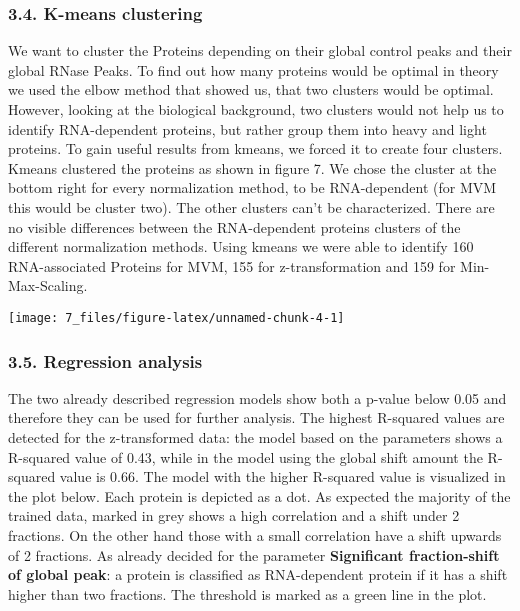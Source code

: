 \documentclass[
  12pt,
]{article}
\begin{document}
\hypertarget{k-means-clustering-1}{%
\subsubsection{3.4. K-means clustering}\label{k-means-clustering-1}}

We want to cluster the Proteins depending on their global control peaks
and their global RNase Peaks. To find out how many proteins would be
optimal in theory we used the elbow method that showed us, that two
clusters would be optimal. However, looking at the biological
background, two clusters would not help us to identify RNA-dependent
proteins, but rather group them into heavy and light proteins. To gain
useful results from kmeans, we forced it to create four clusters. Kmeans
clustered the proteins as shown in figure 7. We chose the cluster at the
bottom right for every normalization method, to be RNA-dependent (for
MVM this would be cluster two). The other clusters can't be
characterized. There are no visible differences between the
RNA-dependent proteins clusters of the different normalization methods.
Using kmeans we were able to identify 160 RNA-associated Proteins for
MVM, 155 for z-transformation and 159 for Min-Max-Scaling.

\texttt{[image: 7\_files/figure-latex/unnamed-chunk-4-1]}

\hypertarget{regression-analysis-1}{%
\subsubsection{3.5. Regression analysis}\label{regression-analysis-1}}

The two already described regression models show both a p-value below
0.05 and therefore they can be used for further analysis. The highest
R-squared values are detected for the z-transformed data: the model
based on the parameters shows a R-squared value of 0.43, while in the
model using the global shift amount the R-squared value is 0.66. The
model with the higher R-squared value is visualized in the plot below.
Each protein is depicted as a dot. As expected the majority of the
trained data, marked in grey shows a high correlation and a shift under
2 fractions. On the other hand those with a small correlation have a
shift upwards of 2 fractions. As already decided for the parameter
\textbf{Significant fraction-shift of global peak}: a protein is
classified as RNA-dependent protein if it has a shift higher than two
fractions. The threshold is marked as a green line in the plot.
\end{document}
